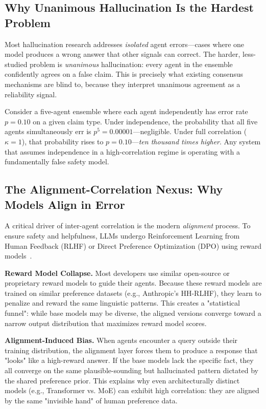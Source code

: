 \documentclass[conference]{IEEEtran}
\begin{document}
\subsection{Why Unanimous Hallucination Is the Hardest Problem}

Most hallucination research addresses \emph{isolated} agent
errors---cases where one model produces a wrong answer that other
signals can correct.
The harder, less-studied problem is \emph{unanimous} hallucination:
every agent in the ensemble confidently agrees on a false claim.
This is precisely what existing consensus mechanisms are blind to,
because they interpret unanimous agreement as a reliability signal.

Consider a five-agent ensemble where each agent independently
has error rate $p = 0.10$ on a given claim type.
Under independence, the probability that all five agents
simultaneously err is $p^5 = 0.00001$—negligible.
Under full correlation ($\kappa = 1$), that probability rises
to $p = 0.10$—\emph{ten thousand times higher}.
Any system that assumes independence in a high-correlation
regime is operating with a fundamentally false safety model.

\subsection{The Alignment-Correlation Nexus: Why Models Align in Error}
\label{sec:alignment}

A critical driver of inter-agent correlation is the modern
\emph{alignment} process.
To ensure safety and helpfulness, LLMs undergo Reinforcement
Learning from Human Feedback (RLHF) or Direct Preference
Optimization (DPO) using reward models~\cite{ouyang2022instructgpt}.

\textbf{Reward Model Collapse.}
Most developers use similar open-source or proprietary reward
models to guide their agents.
Because these reward models are trained on similar preference
datasets (e.g., Anthropic's HH-RLHF), they learn to penalize
and reward the same linguistic patterns.
This creates a "statistical funnel": while base models may be
diverse, the aligned versions converge toward a narrow output
distribution that maximizes reward model scores.

\textbf{Alignment-Induced Bias.}
When agents encounter a query outside their training distribution,
the alignment layer forces them to produce a response that
"looks" like a high-reward answer.
If the base models lack the specific fact, they all converge on
the same plausible-sounding but hallucinated pattern dictated
by the shared preference prior.
This explains why even architecturally distinct models (e.g.,
Transformer vs. MoE) can exhibit high correlation: they are
aligned by the same "invisible hand" of human preference data.
\end{document}
